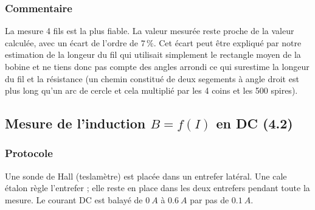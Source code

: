 \subsubsection{Commentaire}
La mesure 4 fils est la plus fiable.
La valeur mesurée reste proche de la valeur calculée, avec un écart de l'ordre de \(7\,\%\). Cet écart peut être expliqué par notre estimation de la longeur du fil qui utilisait simplement le rectangle moyen de la bobine et ne tiens donc pas compte des angles arrondi ce qui surestime la longeur du fil et la résistance (un chemin constitué de deux segements à angle droit est plus long qu'un arc de cercle et cela multiplié par les 4 coins et les 500 spires).
\newpage
\subsection{Mesure de l'induction \texorpdfstring{\(B=f(I)\)}{B=f(I)} en DC (4.2)}

\subsubsection{Protocole}
Une sonde de Hall (teslamètre) est placée dans un entrefer latéral. Une cale étalon règle l'entrefer ; elle reste en place dans les deux entrefers pendant toute la mesure. Le courant DC est balayé de \(\SI{0}{A}\) à \(\SI{0.6}{A}\) par pas de \(\SI{0.1}{A}\).

